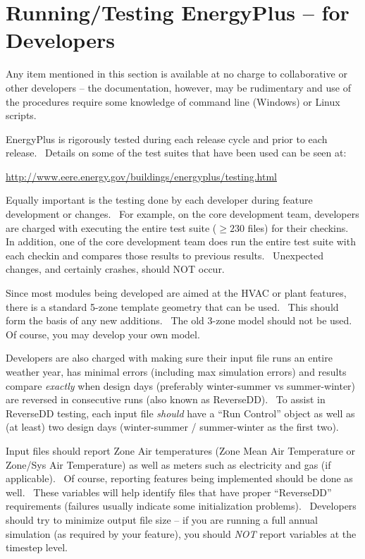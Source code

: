 \chapter{Running/Testing EnergyPlus -- for Developers}\label{runningtesting-energyplus-for-developers}

Any item mentioned in this section is available at no charge to collaborative or other developers -- the documentation, however, may be rudimentary and use of the procedures require some knowledge of command line (Windows) or Linux scripts.

EnergyPlus is rigorously tested during each release cycle and prior to each release.~ Details on some of the test suites that have been used can be seen at:

\url{http://www.eere.energy.gov/buildings/energyplus/testing.html}

Equally important is the testing done by each developer during feature development or changes.~ For example, on the core development team, developers are charged with executing the entire test suite (\(\ge 230\) files) for their checkins.~ In addition, one of the core development team does run the entire test suite with each checkin and compares those results to previous results.~ Unexpected changes, and certainly crashes, should NOT occur.

Since most modules being developed are aimed at the HVAC or plant features, there is a standard 5-zone template geometry that can be used.~ This should form the basis of any new additions.~ The old 3-zone model should not be used.~ Of course, you may develop your own model.

Developers are also charged with making sure their input file runs an entire weather year, has minimal errors (including max simulation errors) and results compare \emph{exactly} when design days (preferably winter-summer vs summer-winter) are reversed in consecutive runs (also known as ReverseDD).~ To assist in ReverseDD testing, each input file \emph{should} have a ``Run Control'' object as well as (at least) two design days (winter-summer / summer-winter as the first two).

Input files should report Zone Air temperatures (Zone Mean Air Temperature or Zone/Sys Air Temperature) as well as meters such as electricity and gas (if applicable).~ Of course, reporting features being implemented should be done as well.~ These variables will help identify files that have proper ``ReverseDD'' requirements (failures usually indicate some initialization problems).~ Developers should try to minimize output file size -- if you are running a full annual simulation (as required by your feature), you should \emph{NOT} report variables at the timestep level.

